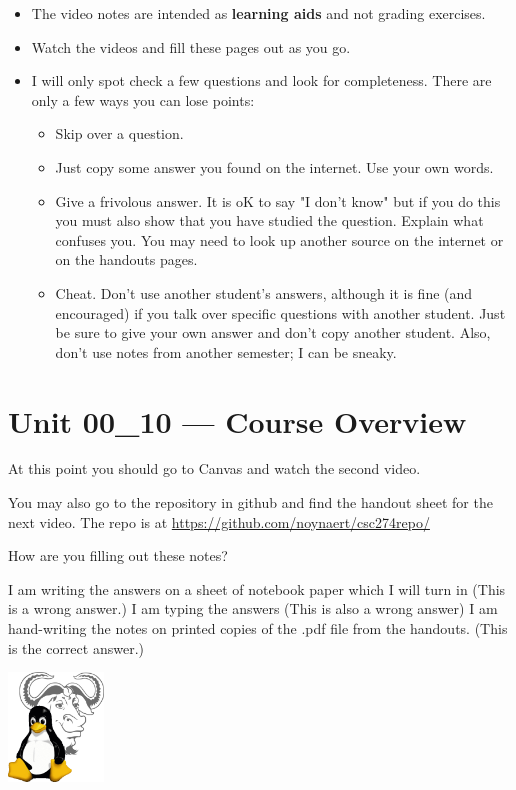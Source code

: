 \documentclass[letterpaper,12pt]{exam}
\begin{document}
  \begin{itemize}
	\item The video notes are intended as \textbf{learning aids} and not grading exercises.
	\item Watch the videos and fill these pages out as you go.
	\item I will only spot check a few questions and look for completeness.  There are only a few ways you can lose points:
	   \begin{itemize}
	     \item Skip over a question.
		 \item Just copy some answer you found on the internet.  Use your own words.
	     \item Give a frivolous answer.  It is oK to say "I don't know" but if you do this you must also show that you have studied the question.  Explain what confuses you.  You may need to look up another source on the internet or on the handouts pages.
	     \item Cheat.  Don't use another student's answers, although it is fine (and encouraged) if you talk over specific questions with another student.  Just be sure to give your own answer and don't copy another student.  Also, don't use notes from another semester; I can be sneaky.
	   \end{itemize}
	\end{itemize}

   
\section*{Unit 00\_10 --- Course Overview}

\begin{center}
At this point you should go to Canvas and watch the second video.

You may also go to the repository in github and find the handout sheet for the next video.  
The repo is at \url{https://github.com/noynaert/csc274repo/}
\end{center}
\begin{questions}
\question How are you filling out these notes?
\begin{checkboxes}
\choice I am writing the answers on a sheet of notebook paper which I will turn in (This is a wrong answer.)
\choice I am typing the answers (This is also a wrong answer)
\choice I am hand-writing the notes on printed copies of the .pdf file from the handouts. (This is the correct answer.)
\choice 
\end{checkboxes}
\end{questions}

\includegraphics[width=1in]{tux}\label{end}
\end{document}
